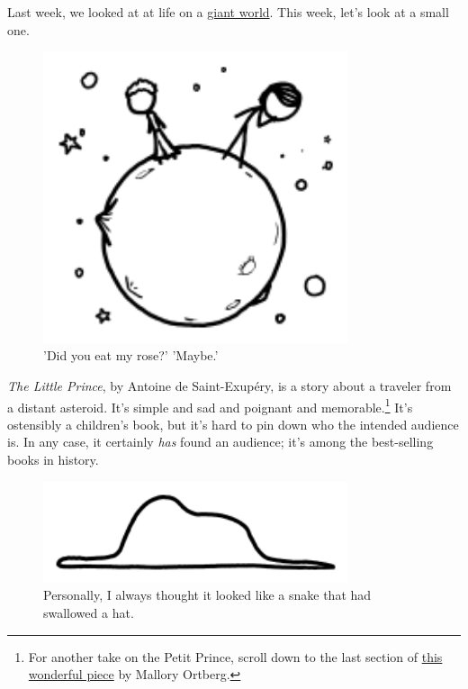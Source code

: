 {\hfill{}

{Last week, we looked at at life on a \href{http://what-if.xkcd.com/67/}{giant world}. This week, let's look at a small one.}

\begin{figure}[!htbp]
\centering
\includegraphics[scale=0.5, max width=0.8\textwidth]{imgs/a/68/asteroid_asteroid.png}
\caption{'Did you eat my rose?' 'Maybe.'}
\end{figure}

{ \emph{The Little Prince}, by Antoine de Saint-Exupéry, is a story about a traveler from a distant asteroid. It's simple and sad and poignant and memorable.{\footnote{For another take on the Petit Prince, scroll down to the last section of \href{http://the-toast.net/2013/08/02/texts-from-peter-pan-et-al/}{this wonderful piece} by Mallory Ortberg.} } It's ostensibly a children's book, but it's hard to pin down who the intended audience is. In any case, it certainly \emph{has} found an audience; it's among the best-selling books in history.}

\begin{figure}[!htbp]
\centering
\includegraphics[scale=0.5, max width=0.8\textwidth]{imgs/a/68/asteroid_snake.png}
\caption{Personally, I always thought it looked like a snake that had swallowed a hat.}
\end{figure}

}
